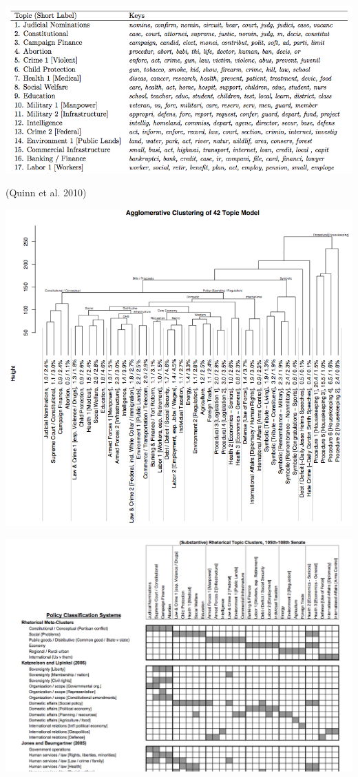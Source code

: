 \documentclass[11pt,compress,professionalfonts]{beamer}
\begin{document}
\centerline{\includegraphics[scale=.8]{pictures/topic-words}} 

{\footnotesize (Quinn et al. 2010)}


\centerline{\includegraphics[scale=.55]{pictures/topic-clustering}}


\centerline{\includegraphics[scale=.5]{pictures/other-schemes}}
\end{document}
